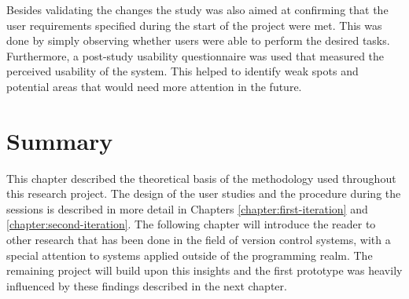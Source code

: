Besides validating the changes the study was also aimed at confirming that the user requirements specified during the start of the project were met. This was done by simply observing whether users were able to perform the desired tasks. Furthermore, a post-study usability questionnaire was used that measured the perceived usability of the system. This helped to identify weak spots and potential areas that would need more attention in the future.



\section{Summary}
This chapter described the theoretical basis of the methodology used throughout this research project. The design of the user studies and the procedure during the sessions is described in more detail in Chapters \ref{chapter:first-iteration} and \ref{chapter:second-iteration}. The following chapter will introduce the reader to other research that has been done in the field of version control systems, with a special attention to systems applied outside of the programming realm. The remaining project will build upon this insights and the first prototype was heavily influenced by these findings described in the next chapter.



